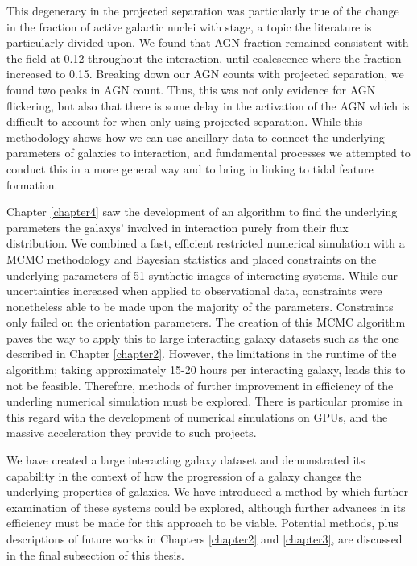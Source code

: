 This degeneracy in the projected separation was particularly true of the change in the fraction of active galactic nuclei with stage, a topic the literature is particularly divided upon. We found that AGN fraction remained consistent with the field at 0.12 throughout the interaction, until coalescence where the fraction increased to 0.15. Breaking down our AGN counts with projected separation, we found two peaks in AGN count. Thus, this was not only evidence for AGN flickering, but also that there is some delay in the activation of the AGN which is difficult to account for when only using projected separation. While this methodology shows how we can use ancillary data to connect the underlying parameters of galaxies to interaction, and fundamental processes we attempted to conduct this in a more general way and to bring in linking to tidal feature formation. 

Chapter \ref{chapter4} saw the development of an algorithm to find the underlying parameters the galaxys' involved in interaction purely from their flux distribution. We combined a fast, efficient restricted numerical simulation with a MCMC methodology and Bayesian statistics and placed constraints on the underlying parameters of 51 synthetic images of interacting systems. While our uncertainties increased when applied to observational data, constraints were nonetheless able to be made upon the majority of the parameters. Constraints only failed on the orientation parameters. The creation of this MCMC algorithm paves the way to apply this to large interacting galaxy datasets such as the one described in Chapter \ref{chapter2}. However, the limitations in the runtime of the algorithm; taking approximately 15-20 hours per interacting galaxy, leads this to not be feasible. Therefore, methods of further improvement in efficiency of the underling numerical simulation must be explored. There is particular promise in this regard with the development of numerical simulations on GPUs, and the massive acceleration they provide to such projects.

We have created a large interacting galaxy dataset and demonstrated its capability in the context of how the progression of a galaxy changes the underlying properties of galaxies. We have introduced a method by which further examination of these systems could be explored, although further advances in its efficiency must be made for this approach to be viable. Potential methods, plus descriptions of future works in Chapters \ref{chapter2} and \ref{chapter3}, are discussed in the final subsection of this thesis.

